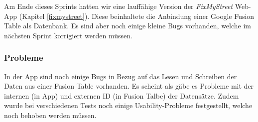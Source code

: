 Am Ende dieses Sprints hatten wir eine lauffähige Version der \emph{FixMyStreet} Web-App (Kapitel \ref{fixmystreet}). Diese beinhaltete die Anbindung einer Google Fusion Table als Datenbank. Es sind aber noch einige kleine Bugs vorhanden, welche im nächsten Sprint korrigiert werden müssen.

\subsubsection{Probleme}
In der App sind noch einige Bugs in Bezug auf das Lesen und Schreiben der Daten aus einer Fusion Table vorhanden. Es scheint als gäbe es Probleme mit der internen (in App) und externen ID (in Fusion Talbe) der Datensätze. Zudem wurde bei verschiedenen Tests noch einige Usability-Probleme festgestellt, welche noch behoben werden müssen.